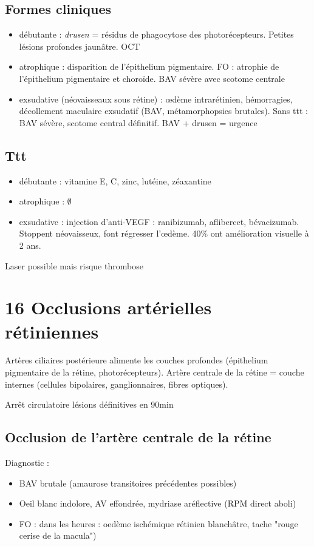 \documentclass[11pt]{article}
\begin{document}
\subsection{Formes cliniques}
\label{sec:org2d774e2}
\begin{itemize}
\item débutante : \emph{drusen} = résidus de phagocytose des photorécepteurs. Petites
lésions profondes jaunâtre. OCT
\item atrophique : disparition de l'épithelium pigmentaire. FO : atrophie de
l'épithelium pigmentaire et choroïde. BAV sévère avec scotome centrale
\item exsudative (néovaisseaux sous rétine) : \oe{}dème intrarétinien, hémorragies,
décollement maculaire exsudatif (BAV, métamorphopsies brutales). Sans ttt :
BAV sévère, scotome central définitif. BAV + drusen = urgence \skull
\end{itemize}

\subsection{Ttt}
\label{sec:orgd614e37}
\begin{itemize}
\item débutante : vitamine E, C, zinc, lutéine, zéaxantine
\item atrophique : \(\emptyset\)
\item exsudative : injection d'anti-VEGF : ranibizumab, 
aflibercet, bévacizumab. Stoppent néovaisseux, font régresser l'\oe{}dème. 40\%
ont amélioration visuelle à 2 ans.
\end{itemize}
Laser possible mais risque thrombose
\section{16 Occlusions artérielles rétiniennes}
\label{sec:orgf1904fd}
Artères ciliaires postérieure alimente les couches profondes (épithelium
pigmentaire de la rétine, photorécepteurs). 
Artère centrale de la rétine = couche internes (cellules bipolaires,
ganglionnaires, fibres optiques).

Arrêt circulatoire \thus lésions définitives en 90min \danger

\subsection{Occlusion de l'artère centrale de la rétine}
\label{sec:org767be22}
Diagnostic : 
\begin{itemize}
\item BAV brutale (amaurose transitoires précédentes possibles)
\item Oeil blanc indolore, AV effondrée, mydriase aréflective (RPM direct aboli)
\item FO : dans les heures : oedème ischémique rétinien blanchâtre, tache "rouge
cerise de la macula")
\end{itemize}
\end{document}

